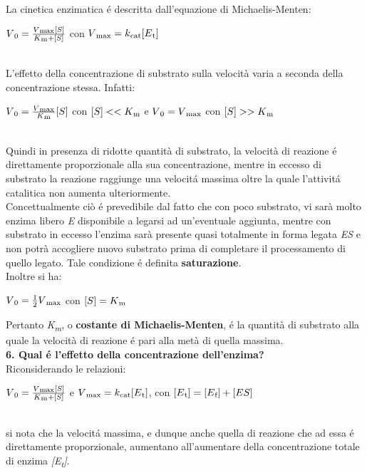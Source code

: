 \documentclass[a4paper,12pt]{article}
\begin{document}
La cinetica enzimatica \'e descritta dall'equazione di Michaelis-Menten:
\begin{center}$V\textsubscript{0} = \frac{V\textsubscript{max}[S]}{K\textsubscript{m} + [S]}$ con $V\textsubscript{max} = k\textsubscript{cat}[E\textsubscript{t}]$\end{center}\\
L'effetto della concentrazione di substrato sulla velocit\`a varia a seconda della concentrazione stessa. Infatti:
\begin{center}$V\textsubscript{0} = \frac{V\textsubscript{max}}{K\textsubscript{m}}[S]$ con $[S] << K\textsubscript{m}$ e $V\textsubscript{0} = V\textsubscript{max}$ con $[S] >> K\textsubscript{m}$\end{center}\\
Quindi in presenza di ridotte quantit\`a di substrato, la velocit\`a di reazione \'e direttamente proporzionale alla sua concentrazione, mentre in eccesso di substrato la reazione raggiunge una velocit\'a massima oltre la quale l'attivit\'a catalitica non aumenta ulteriormente.\\
Concettualmente ci\`o \'e prevedibile dal fatto che con poco substrato, vi sar\`a molto enzima libero \textit{E} disponibile a legarsi ad un'eventuale aggiunta, mentre con substrato in eccesso l'enzima sar\`a presente quasi totalmente in forma legata \textit{ES} e non potr\`a accogliere nuovo substrato prima di completare il processamento di quello legato. Tale condizione \'e definita \textbf{saturazione}.\\
Inoltre si ha:
\begin{center}$V\textsubscript{0} = \frac{1}{2}V\textsubscript{max}$ con $[S] = K\textsubscript{m}$\end{center}
Pertanto \textit{K\textsubscript{m}}, o \textbf{costante di Michaelis-Menten}, \'e la quantit\`a di substrato alla quale la velocit\`a di reazione \'e pari alla met\`a di quella massima.\\

\textbf{6. Qual \'e l'effetto della concentrazione dell'enzima?}\\

Riconsiderando le relazioni:
\begin{center}$V\textsubscript{0} = \frac{V\textsubscript{max}[S]}{K\textsubscript{m} + [S]}$ e $V\textsubscript{max} = k\textsubscript{cat}[E\textsubscript{t}]$, con $[E\textsubscript{t}] = [E\textsubscript{f}] + [ES]$\end{center}\\
si nota che la velocit\'a massima, e dunque anche quella di reazione che ad essa \'e direttamente proporzionale, aumentano all'aumentare della concentrazione totale di enzima \textit{[E\textsubscript{t}]}.\\
\end{document}
